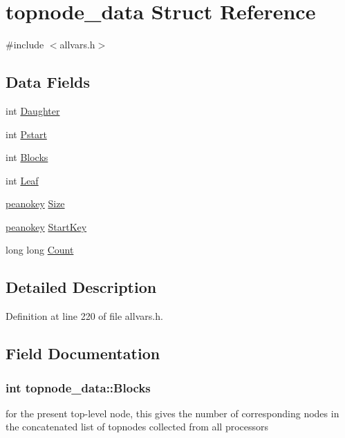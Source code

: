 \hypertarget{structtopnode__data}{
\section{topnode\_\-data Struct Reference}
\label{structtopnode__data}
}


{\ttfamily \#include $<$allvars.h$>$}

\subsection*{Data Fields}
\begin{DoxyCompactItemize}
\item 
int \hyperlink{structtopnode__data_ad2e76e39d74f3c299b38fa680ecdb794}{Daughter}
\item 
int \hyperlink{structtopnode__data_abe0b214b3cf372c95a16966304b1592c}{Pstart}
\item 
int \hyperlink{structtopnode__data_abad41cd99537e7a3a0d78ac5f291e42d}{Blocks}
\item 
int \hyperlink{structtopnode__data_aa5c48f2ae0bd1e2ed8ca069e4eeb29cd}{Leaf}
\item 
\hyperlink{allvars_8h_a63f10772bd5776dcb4b6301f425e0d26}{peanokey} \hyperlink{structtopnode__data_a7a06f0263a5602d4c073100a517892b8}{Size}
\item 
\hyperlink{allvars_8h_a63f10772bd5776dcb4b6301f425e0d26}{peanokey} \hyperlink{structtopnode__data_ab6ae6e924fec05c69ab73ddc2941e855}{StartKey}
\item 
long long \hyperlink{structtopnode__data_a3cae714f1f71f6ce4750004ee6fbda06}{Count}
\end{DoxyCompactItemize}


\subsection{Detailed Description}


Definition at line 220 of file allvars.h.



\subsection{Field Documentation}
\hypertarget{structtopnode__data_abad41cd99537e7a3a0d78ac5f291e42d}{
\subsubsection[{Blocks}]{\setlength{\rightskip}{0pt plus 5cm}int {\bf topnode\_\-data::Blocks}}}
\label{structtopnode__data_abad41cd99537e7a3a0d78ac5f291e42d}
for the present top-\/level node, this gives the number of corresponding nodes in the concatenated list of topnodes collected from all processors 

